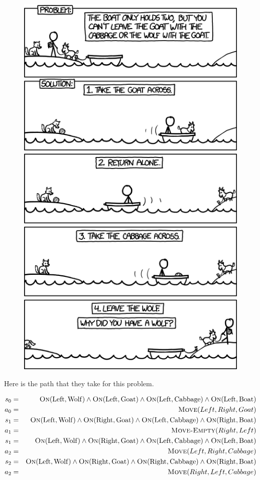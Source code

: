 \documentclass[11pt]{article}
\begin{document}
\begin{figure}
  \centering
  \includegraphics[width=0.6\linewidth]{logic_boat}
  \label{fig:goat}
\end{figure}

Here is the path that they take for this problem. 

\begin{eqnarray*}
 s_0 & = & \mathrm{\textsc{On}}(\mathrm{Left}, \mathrm{Wolf}) \land \mathrm{\textsc{On}}(\mathrm{Left}, \mathrm{Goat}) \land \mathrm{\textsc{On}}(\mathrm{Left}, \mathrm{Cabbage}) \land \mathrm{\textsc{On}}(\mathrm{Left}, \mathrm{Boat}) \\
a_0 & = &  \mathrm{\textsc{Move}}(Left, Right, Goat) \\
 s_1 & = & \mathrm{\textsc{On}}(\mathrm{Left}, \mathrm{Wolf}) \land \mathrm{\textsc{On}}(\mathrm{Right}, \mathrm{Goat}) \land \mathrm{\textsc{On}}(\mathrm{Left}, \mathrm{Cabbage}) \land \mathrm{\textsc{On}}(\mathrm{Right}, \mathrm{Boat}) \\
a_1 & = &  \mathrm{\textsc{Move-Empty}}(Right, Left) \\
 s_1 & = & \mathrm{\textsc{On}}(\mathrm{Left}, \mathrm{Wolf}) \land \mathrm{\textsc{On}}(\mathrm{Right}, \mathrm{Goat}) \land \mathrm{\textsc{On}}(\mathrm{Left}, \mathrm{Cabbage}) \land \mathrm{\textsc{On}}(\mathrm{Left}, \mathrm{Boat}) \\
a_2 & = &  \mathrm{\textsc{Move}}(Left, Right, Cabbage) \\
s_2 & = & \mathrm{\textsc{On}}(\mathrm{Left}, \mathrm{Wolf}) \land \mathrm{\textsc{On}}(\mathrm{Right}, \mathrm{Goat}) \land \mathrm{\textsc{On}}(\mathrm{Right}, \mathrm{Cabbage}) \land \mathrm{\textsc{On}}(\mathrm{Right}, \mathrm{Boat}) \\
a_2 & = &  \mathrm{\textsc{Move}}(Right, Left, Cabbage) \\
\end{eqnarray*}
\end{document}

